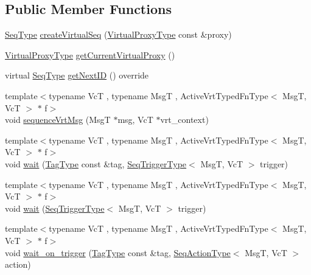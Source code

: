 \subsection*{Public Member Functions}
\begin{DoxyCompactItemize}
\item 
\hyperlink{structvt_1_1seq_1_1_tagged_sequencer_a1c8ee839258d0f88c49ef660267a81d5}{Seq\+Type} \hyperlink{structvt_1_1seq_1_1_tagged_sequencer_vrt_af7d9b524bcfab43dbc06c3a6b3e140f0}{create\+Virtual\+Seq} (\hyperlink{namespacevt_a1b417dd5d684f045bb58a0ede70045ac}{Virtual\+Proxy\+Type} const \&proxy)
\item 
\hyperlink{namespacevt_a1b417dd5d684f045bb58a0ede70045ac}{Virtual\+Proxy\+Type} \hyperlink{structvt_1_1seq_1_1_tagged_sequencer_vrt_ab022ac29916fd6b9df9161567cbbd910}{get\+Current\+Virtual\+Proxy} ()
\item 
virtual \hyperlink{structvt_1_1seq_1_1_tagged_sequencer_a1c8ee839258d0f88c49ef660267a81d5}{Seq\+Type} \hyperlink{structvt_1_1seq_1_1_tagged_sequencer_vrt_a2dff0d8c70573a608c199b81657a19cb}{get\+Next\+ID} () override
\item 
{\footnotesize template$<$typename VcT , typename MsgT , Active\+Vrt\+Typed\+Fn\+Type$<$ Msg\+T, Vc\+T $>$ $\ast$ f$>$ }\\void \hyperlink{structvt_1_1seq_1_1_tagged_sequencer_vrt_aae7a0943397b44e3f43160008e2b8d42}{sequence\+Vrt\+Msg} (MsgT $\ast$msg, VcT $\ast$vrt\+\_\+context)
\item 
{\footnotesize template$<$typename VcT , typename MsgT , Active\+Vrt\+Typed\+Fn\+Type$<$ Msg\+T, Vc\+T $>$ $\ast$ f$>$ }\\void \hyperlink{structvt_1_1seq_1_1_tagged_sequencer_vrt_a8897cf74185e38e4d6b222bdab539f31}{wait} (\hyperlink{namespacevt_a84ab281dae04a52a4b243d6bf62d0e52}{Tag\+Type} const \&tag, \hyperlink{structvt_1_1seq_1_1_tagged_sequencer_a4b015f2f7d3197a66af5576f0e63a834}{Seq\+Trigger\+Type}$<$ MsgT, VcT $>$ trigger)
\item 
{\footnotesize template$<$typename VcT , typename MsgT , Active\+Vrt\+Typed\+Fn\+Type$<$ Msg\+T, Vc\+T $>$ $\ast$ f$>$ }\\void \hyperlink{structvt_1_1seq_1_1_tagged_sequencer_vrt_a88706e19289453ba99602e50dff901dd}{wait} (\hyperlink{structvt_1_1seq_1_1_tagged_sequencer_a4b015f2f7d3197a66af5576f0e63a834}{Seq\+Trigger\+Type}$<$ MsgT, VcT $>$ trigger)
\item 
{\footnotesize template$<$typename VcT , typename MsgT , Active\+Vrt\+Typed\+Fn\+Type$<$ Msg\+T, Vc\+T $>$ $\ast$ f$>$ }\\void \hyperlink{structvt_1_1seq_1_1_tagged_sequencer_vrt_a768f8c419f42b3dad84ebce3f046f0e9}{wait\+\_\+on\+\_\+trigger} (\hyperlink{namespacevt_a84ab281dae04a52a4b243d6bf62d0e52}{Tag\+Type} const \&tag, \hyperlink{structvt_1_1seq_1_1_tagged_sequencer_a0210dbd34288d440e0cd51db9d6637bd}{Seq\+Action\+Type}$<$ MsgT, VcT $>$ action)
\end{DoxyCompactItemize}
